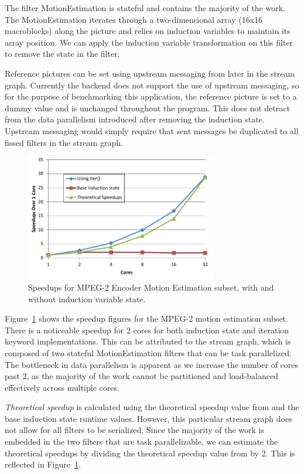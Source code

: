 The filter MotionEstimation is stateful and contains the majority of the work.  The MotionEstimation iterates through a two-dimensional array (16x16 macroblocks) along the picture and relies on induction variables to maintain its array position.  We can apply the induction variable transformation on this filter to remove the state in the filter.

Reference pictures can be set using upstream messaging from later in the stream graph.  Currently the backend does not support the use of upstream messaging, so for the purpose of benchmarking this application, the reference picture is set to a dummy value and is unchanged throughout the program.  This does not detract from the data parallelism introduced after removing the induction state.  Upstream messaging would simply require that sent messages be duplicated to all fissed filters in the stream graph.

\begin{figure}[t]
\includegraphics[width=3.3in]{figures/mpeg-results.pdf}
\caption{Speedups for MPEG-2 Encoder Motion Estimation subset, with and without induction variable state.  \protect\label{fig:mpeg-results}}
\end{figure}

Figure~\ref{fig:mpeg-results} shows the speedup figures for the MPEG-2 motion estimation subset.  There is a noticeable speedup for 2 cores for both induction state and iteration keyword implementations.  This can be attributed to the stream graph, which is composed of two stateful MotionEstimation filters that can be task parallelized.  The bottleneck in data parallelism is apparent as we increase the number of cores past 2, as the majority of the work cannot be partitioned and load-balanced effectively across multiple cores.  

{\it Theoretical speedup} is calculated using the theoretical speedup value from \label{sec:model-analysis} and the base induction state runtime values.  However, this particular stream graph does not allow for all filters to be serialized.  Since the majority of the work is embedded in the two filters that are task parallelizable, we can estimate the theoretical speedups by dividing the theoretical speedup value from \label{sec:model-analysis} by 2.  This is reflected in Figure~\ref{fig:mpeg-results}.

